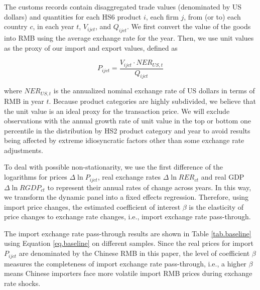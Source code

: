 \documentclass[12pt]{article}
\begin{document}
The customs records contain disaggregated trade values (denominated by US dollars) and quantities for each HS6 product $i$, each firm $j$, from (or to) each country $c$, in each year $t$, $V_{ijct}$, and $Q_{ijct}$. We first convert the value of the goods into RMB using the average exchange rate for the year. Then, we use unit values as the proxy of our import and export values, defined as 

$$
P_{ijct}=\frac{V_{ijct}\cdot NER_{US,t}}{Q_{ijct}}
$$

where $NER_{US,t}$ is the annualized nominal exchange rate of US dollars in terms of RMB in year $t$. Because product categories are highly subdivided, we believe that the unit value is an ideal proxy for the transaction price. We will exclude observations with the annual growth rate of unit value in the top or bottom one percentile in the distribution by HS2 product category and year to avoid results being affected by extreme idiosyncratic factors other than some exchange rate adjustments.

To deal with possible non-stationarity, we use the first difference of the logarithms for prices $\Delta \ln P_{i j c t}$, real exchange rates $\Delta \ln R E R_{c t}$ and real GDP $\Delta \ln R G D P_{c t}$ to represent their annual rates of change across years. In this way, we transform the dynamic panel into a fixed effects regression. Therefore, using import price changes, the estimated coefficient of interest $\beta$ is the elasticity of price changes to exchange rate changes, i.e., import exchange rate pass-through.

The import exchange rate pass-through results are shown in Table \ref{tab.baseline} using Equation \ref{eq.baseline} on different samples. Since the real prices for import $P_{i j c t}$ are denominated by the Chinese RMB in this paper, the level of coefficient $\beta$ measures the completeness of import exchange rate pass-through, i.e., a higher $\beta$ means Chinese importers face more volatile import RMB prices during exchange rate shocks. 
\end{document}
